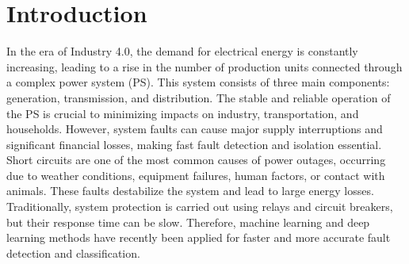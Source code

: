 \documentclass[11pt]{IEEEtran}
\begin{document}
\section{Introduction}
In the era of Industry 4.0, the demand for electrical energy is constantly increasing, leading to a rise in the number of production units connected through a complex power system (PS). This system consists of three main components: generation, transmission, and distribution. The stable and reliable operation of the PS is crucial to minimizing impacts on industry, transportation, and households. However, system faults can cause major supply interruptions and significant financial losses, making fast fault detection and isolation essential.\\
Short circuits are one of the most common causes of power outages, occurring due to weather conditions, equipment failures, human factors, or contact with animals. These faults destabilize the system and lead to large energy losses. Traditionally, system protection is carried out using relays and circuit breakers, but their response time can be slow. Therefore, machine learning and deep learning methods have recently been applied for faster and more accurate fault detection and classification.\\
\end{document}
